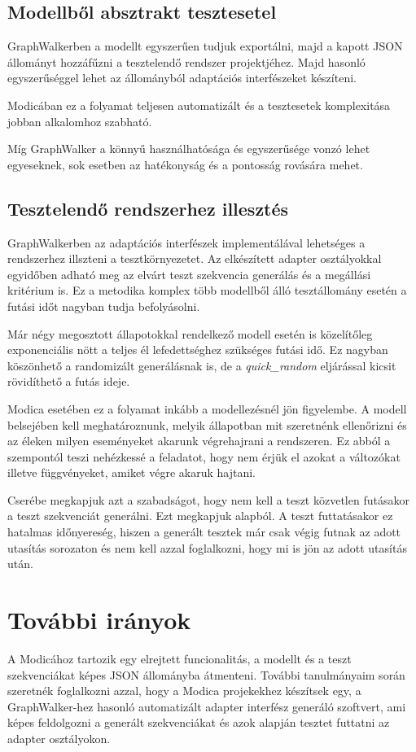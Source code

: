 \subsection{Modellből absztrakt tesztesetel}
GraphWalkerben a modellt egyszerűen tudjuk exportálni, majd a kapott JSON állományt hozzáfűzni a tesztelendő rendszer projektjéhez. Majd hasonló egyszerűséggel lehet az állományból adaptációs interfészeket készíteni.

Modicában ez a folyamat teljesen automatizált és a tesztesetek komplexitása jobban alkalomhoz szabható.

Míg GraphWalker a könnyű használhatósága és egyszerűsége vonzó lehet egyeseknek, sok esetben az hatékonyság és a pontosság rovására mehet. 

\subsection{Tesztelendő rendszerhez illesztés}
GraphWalkerben az adaptációs interfészek implementálával lehetséges a rendszerhez illszteni a tesztkörnyezetet. Az elkészített adapter osztályokkal egyidőben adható meg az elvárt teszt szekvencia generálás és a megállási kritérium is. 
Ez a metodika komplex több modellből álló tesztállomány esetén a futási időt nagyban tudja befolyásolni. 

Már négy megosztott állapotokkal rendelkező modell esetén is közelítőleg exponenciális nött a teljes él lefedettséghez szükséges futási idő. Ez nagyban köszönhető a randomizált generálásnak is, de a \emph{quick\_random} eljárással kicsit rövidíthető a futás ideje.

Modica esetében ez a folyamat inkább a modellezésnél jön figyelembe. A modell belsejében kell meghatároznunk, melyik állapotban mit szeretnénk ellenőrizni és az éleken milyen eseményeket akarunk végrehajrani a rendszeren. 
Ez abból a szempontól teszi nehézkessé a feladatot, hogy nem érjük el azokat a változókat illetve függvényeket, amiket végre akaruk hajtani. 

Cserébe megkapjuk azt a szabadságot, hogy nem kell a teszt közvetlen futásakor a teszt szekvenciát generálni. Ezt megkapjuk alapból. 
A teszt futtatásakor ez hatalmas időnyereség, hiszen a generált tesztek már csak végig futnak az adott utasítás sorozaton és nem kell azzal foglalkozni, hogy mi is jön az adott utasítás után.


\section{További irányok}
A Modicához tartozik egy elrejtett funcionalitás, a modellt és a teszt szekvenciákat képes JSON állományba átmenteni. További tanulmányaim során szeretnék foglalkozni azzal, 
hogy a Modica projekekhez készítsek egy, a GraphWalker-hez hasonló automatizált adapter interfész generáló szoftvert, ami képes feldolgozni a generált szekvenciákat és azok alapján 
tesztet futtatni az adapter osztályokon.

